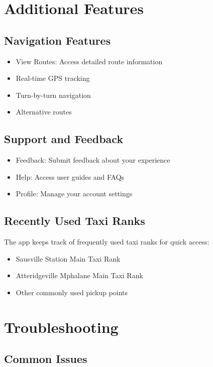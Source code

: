 \documentclass[12pt]{article}
\begin{document}
\newpage
\section{Additional Features}

\subsection{Navigation Features}
\begin{itemize}
    \item View Routes: Access detailed route information
    \item Real-time GPS tracking
    \item Turn-by-turn navigation
    \item Alternative routes
\end{itemize}

\subsection{Support and Feedback}
\begin{itemize}
    \item Feedback: Submit feedback about your experience
    \item Help: Access user guides and FAQs
    \item Profile: Manage your account settings
\end{itemize}

\subsection{Recently Used Taxi Ranks}
The app keeps track of frequently used taxi ranks for quick access:
\begin{itemize}
    \item Sausville Station Main Taxi Rank
    \item Atteridgeville Mphalane Main Taxi Rank
    \item Other commonly used pickup points
\end{itemize}

\newpage
\section{Troubleshooting}

\subsection{Common Issues}
\end{document}
